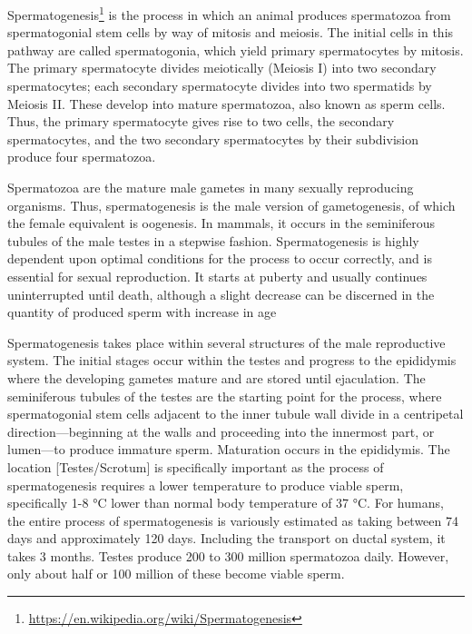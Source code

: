 \documentclass[]{book}
\let\rmarkdownfootnote\footnote%
\def\footnote{\protect\rmarkdownfootnote}
\renewcommand{\href}[2]{#2\footnote{\url{#1}}}
\begin{document}
\href{https://en.wikipedia.org/wiki/Spermatogenesis}{Spermatogenesis} is the process in which an animal produces spermatozoa from spermatogonial stem cells by way of mitosis and meiosis. The initial cells in this pathway are called spermatogonia, which yield primary spermatocytes by mitosis. The primary spermatocyte divides meiotically (Meiosis I) into two secondary spermatocytes; each secondary spermatocyte divides into two spermatids by Meiosis II. These develop into mature spermatozoa, also known as sperm cells. Thus, the primary spermatocyte gives rise to two cells, the secondary spermatocytes, and the two secondary spermatocytes by their subdivision produce four spermatozoa.

Spermatozoa are the mature male gametes in many sexually reproducing organisms. Thus, spermatogenesis is the male version of gametogenesis, of which the female equivalent is oogenesis. In mammals, it occurs in the seminiferous tubules of the male testes in a stepwise fashion. Spermatogenesis is highly dependent upon optimal conditions for the process to occur correctly, and is essential for sexual reproduction. It starts at puberty and usually continues uninterrupted until death, although a slight decrease can be discerned in the quantity of produced sperm with increase in age

Spermatogenesis takes place within several structures of the male reproductive system. The initial stages occur within the testes and progress to the epididymis where the developing gametes mature and are stored until ejaculation. The seminiferous tubules of the testes are the starting point for the process, where spermatogonial stem cells adjacent to the inner tubule wall divide in a centripetal direction---beginning at the walls and proceeding into the innermost part, or lumen---to produce immature sperm. Maturation occurs in the epididymis. The location {[}Testes/Scrotum{]} is specifically important as the process of spermatogenesis requires a lower temperature to produce viable sperm, specifically 1-8 °C lower than normal body temperature of 37 °C. For humans, the entire process of spermatogenesis is variously estimated as taking between 74 days and approximately 120 days. Including the transport on ductal system, it takes 3 months. Testes produce 200 to 300 million spermatozoa daily. However, only about half or 100 million of these become viable sperm.
\end{document}
